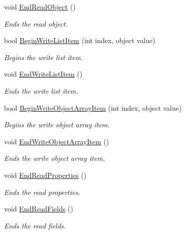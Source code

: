 \begin{DoxyCompactItemize}
void \hyperlink{class_serialization_1_1_binary_serializer_aa58ba842b871ad7030d126215a85c8cc}{End\+Read\+Object} ()
\begin{DoxyCompactList}\small\item\em Ends the read object. \end{DoxyCompactList}\item 
bool \hyperlink{class_serialization_1_1_binary_serializer_abc94830de965bf945253bc73cc3b7b5c}{Begin\+Write\+List\+Item} (int index, object value)
\begin{DoxyCompactList}\small\item\em Begins the write list item. \end{DoxyCompactList}\item 
void \hyperlink{class_serialization_1_1_binary_serializer_aa0099aa23887ecaba8eee43f474fed04}{End\+Write\+List\+Item} ()
\begin{DoxyCompactList}\small\item\em Ends the write list item. \end{DoxyCompactList}\item 
bool \hyperlink{class_serialization_1_1_binary_serializer_a3853730f36226738133280f47ee43550}{Begin\+Write\+Object\+Array\+Item} (int index, object value)
\begin{DoxyCompactList}\small\item\em Begins the write object array item. \end{DoxyCompactList}\item 
void \hyperlink{class_serialization_1_1_binary_serializer_a690c73b90c4f755f4ae1b87fa70eda67}{End\+Write\+Object\+Array\+Item} ()
\begin{DoxyCompactList}\small\item\em Ends the write object array item. \end{DoxyCompactList}\item 
void \hyperlink{class_serialization_1_1_binary_serializer_af889e7729b3bf07d18a86fe32064d4c0}{End\+Read\+Properties} ()
\begin{DoxyCompactList}\small\item\em Ends the read properties. \end{DoxyCompactList}\item 
void \hyperlink{class_serialization_1_1_binary_serializer_a5083f578f8a2aff5fd5163edc802a0d1}{End\+Read\+Fields} ()
\begin{DoxyCompactList}\small\item\em Ends the read fields. \end{DoxyCompactList}\item 

\end{DoxyCompactItemize}

